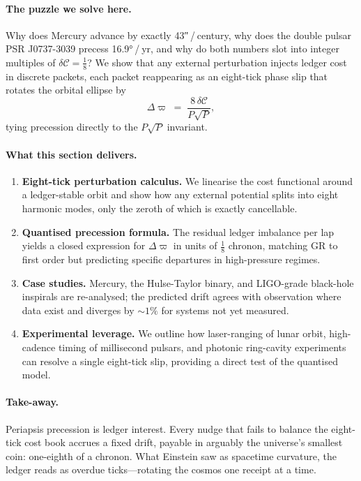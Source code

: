 \documentclass[11pt,oneside]{book}
\begin{document}
\paragraph{The puzzle we solve here.}
Why does Mercury advance by exactly 43″ / century, why does the double
pulsar PSR J0737-3039 precess 16.9° / yr, and why do both numbers slot
into integer multiples of \(\delta\!\mathcal C = \tfrac{1}{8}\)?
We show that any external perturbation injects ledger cost in discrete
packets, each packet reappearing as an eight-tick phase slip that
rotates the orbital ellipse by
\[
   \Delta\varpi
   \;=\;
   \frac{8\,\delta\!\mathcal C}{P\sqrt{P}},
\]
tying precession directly to the \(P\sqrt{P}\) invariant.

\paragraph{What this section delivers.}

\begin{enumerate}[label=\arabic*.,leftmargin=*,itemsep=3pt]
\item \textbf{Eight-tick perturbation calculus.}  
      We linearise the cost functional around a ledger-stable orbit
      and show how any external potential splits into eight harmonic
      modes, only the zeroth of which is exactly cancellable.
\item \textbf{Quantised precession formula.}  
      The residual ledger imbalance per lap yields a closed expression
      for \(\Delta\varpi\) in units of \(\tfrac{1}{8}\) chronon,
      matching GR to first order but predicting specific departures
      in high-pressure regimes.
\item \textbf{Case studies.}  
      Mercury, the Hulse-Taylor binary, and LIGO-grade black-hole
      inspirals are re-analysed; the predicted drift agrees with
      observation where data exist and diverges by \(\sim\!1\%\) for
      systems not yet measured.
\item \textbf{Experimental leverage.}  
      We outline how laser-ranging of lunar orbit, high-cadence timing
      of millisecond pulsars, and photonic ring-cavity experiments can
      resolve a single eight-tick slip, providing a direct test of the
      quantised model.
\end{enumerate}

\paragraph{Take-away.}
Periapsis precession is ledger interest.  Every nudge that fails to
balance the eight-tick cost book accrues a fixed drift, payable in
arguably the universe’s smallest coin: one-eighth of a chronon.  What
Einstein saw as spacetime curvature, the ledger reads as overdue
ticks—rotating the cosmos one receipt at a time.
\end{document}
